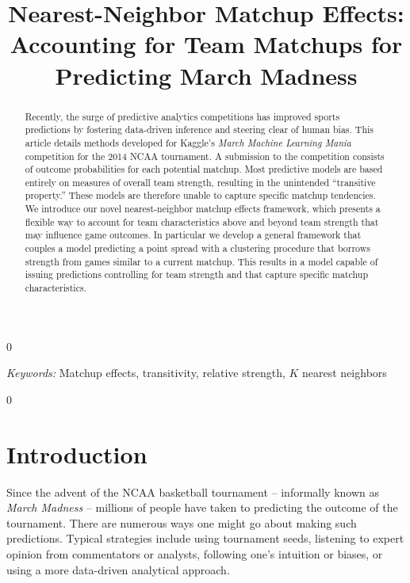 \documentclass[letterpaper,12pt]{article}
\newcommand{\blind}{0}
\begin{document}
\blind
{
\title{Nearest-Neighbor Matchup Effects:  Accounting for Team Matchups for Predicting March Madness}
  \originalmaketitle
  \begin{abstract} 
\noindent
Recently, the surge of predictive analytics competitions has improved sports predictions by fostering data-driven inference and steering clear of human bias. This article details methods developed for Kaggle's \emph{March Machine Learning Mania} competition for the 2014 NCAA tournament. A submission to the competition consists of outcome probabilities for each potential matchup. Most predictive models are based entirely on measures of overall team strength, resulting in the unintended ``transitive property.'' These models are therefore unable to capture specific matchup tendencies. We introduce our novel nearest-neighbor matchup effects framework, which presents a flexible way to account for team characteristics above and beyond team strength that may influence game outcomes. In particular we develop a general framework that couples a model predicting a point spread with a clustering procedure that borrows strength from games similar to a current matchup. This results in a model capable of issuing predictions controlling for team strength and that capture specific matchup characteristics.
\end{abstract}

\noindent%
{\it Keywords:}  Matchup effects, transitivity, relative strength, $K$ nearest neighbors
} \fi

\blind
{
} \fi

\newpage




\section{Introduction}
Since the advent of the NCAA basketball tournament -- informally known as \emph{March Madness} -- millions of people have taken to predicting the outcome of the tournament. There are numerous ways one might go about making such predictions. Typical strategies include using tournament seeds, listening to expert opinion from commentators or analysts, following one's intuition or biases, or using a more data-driven analytical approach. 
\end{document}
